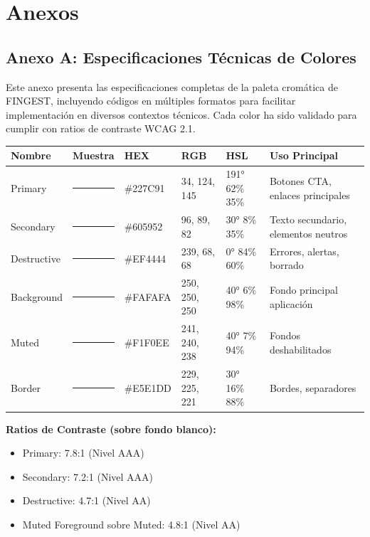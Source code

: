 \documentclass[12pt,a4paper,oneside]{article}
\begin{document}
\newpage


\section{Anexos}

\subsection{Anexo A: Especificaciones Técnicas de Colores}

Este anexo presenta las especificaciones completas de la paleta cromática de FINGEST, incluyendo códigos en múltiples formatos para facilitar implementación en diversos contextos técnicos. Cada color ha sido validado para cumplir con ratios de contraste WCAG 2.1.

\begin{center}
\begin{tabular}{|l|c|l|l|l|p{4cm}|}
\hline
\textbf{Nombre} & \textbf{Muestra} & \textbf{HEX} & \textbf{RGB} & \textbf{HSL} & \textbf{Uso Principal} \\
\hline
Primary & \colorbox{primary}{\color{white}\rule{0pt}{12pt}\rule{20pt}{0pt}} & \#227C91 & 34, 124, 145 & 191° 62\% 35\% & Botones CTA, enlaces principales \\
\hline
Secondary & \colorbox{secondary}{\color{white}\rule{0pt}{12pt}\rule{20pt}{0pt}} & \#605952 & 96, 89, 82 & 30° 8\% 35\% & Texto secundario, elementos neutros \\
\hline
Destructive & \colorbox{destructive}{\color{white}\rule{0pt}{12pt}\rule{20pt}{0pt}} & \#EF4444 & 239, 68, 68 & 0° 84\% 60\% & Errores, alertas, borrado \\
\hline
Background & \colorbox{background}{\color{black}\rule{0pt}{12pt}\rule{20pt}{0pt}} & \#FAFAFA & 250, 250, 250 & 40° 6\% 98\% & Fondo principal aplicación \\
\hline
Muted & \colorbox{muted}{\color{black}\rule{0pt}{12pt}\rule{20pt}{0pt}} & \#F1F0EE & 241, 240, 238 & 40° 7\% 94\% & Fondos deshabilitados \\
\hline
Border & \colorbox{border}{\color{black}\rule{0pt}{12pt}\rule{20pt}{0pt}} & \#E5E1DD & 229, 225, 221 & 30° 16\% 88\% & Bordes, separadores \\
\hline
\end{tabular}
\end{center}

\vspace{0.5cm}

\textbf{Ratios de Contraste (sobre fondo blanco):}
\begin{itemize}
    \item Primary: 7.8:1 (Nivel AAA)
    \item Secondary: 7.2:1 (Nivel AAA)
    \item Destructive: 4.7:1 (Nivel AA)
    \item Muted Foreground sobre Muted: 4.8:1 (Nivel AA)
\end{itemize}
\end{document}

